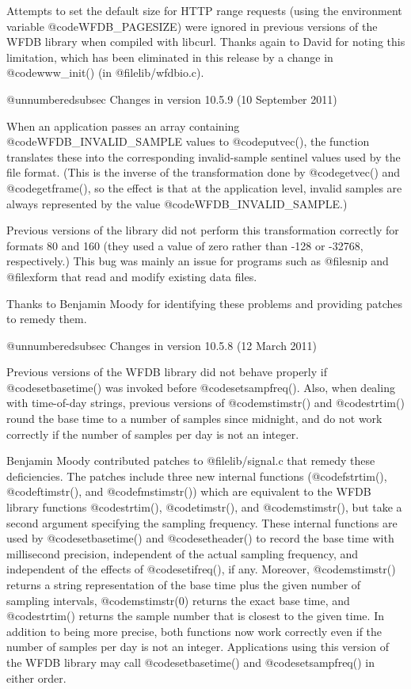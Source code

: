 {{{{{{{{Attempts to set the default size for HTTP range requests (using the environment
variable @code{WFDB_PAGESIZE}) were ignored in previous versions of the WFDB
library when compiled with libcurl.  Thanks again to David for noting this
limitation, which has been eliminated in this release by a change in
@code{www_init()} (in @file{lib/wfdbio.c}).

@unnumberedsubsec Changes in version 10.5.9 (10 September 2011)

When an application passes an array containing @code{WFDB_INVALID_SAMPLE}
values to @code{putvec()}, the function translates these into the corresponding
invalid-sample sentinel values used by the file format.  (This is the inverse
of the transformation done by @code{getvec()} and @code{getframe()}, so the
effect is that at the application level, invalid samples are always represented
by the value @code{WFDB_INVALID_SAMPLE}.)

Previous versions of the library did not perform this transformation correctly
for formats 80 and 160 (they used a value of zero rather than -128 or -32768,
respectively.)  This bug was mainly an issue for programs such as @file{snip}
and @file{xform} that read and modify existing data files.

Thanks to Benjamin Moody for identifying these problems and providing patches
to remedy them.

@unnumberedsubsec Changes in version 10.5.8 (12 March 2011)

Previous versions of the WFDB library did not behave properly if
@code{setbasetime()} was invoked before @code{setsampfreq()}.  Also, when
dealing with time-of-day strings, previous versions of @code{mstimstr()} and
@code{strtim()} round the base time to a number of samples since midnight, and
do not work correctly if the number of samples per day is not an integer.

Benjamin Moody contributed patches to @file{lib/signal.c} that remedy these
deficiencies.  The patches include three new internal functions
(@code{fstrtim()}, @code{ftimstr()}, and @code{fmstimstr()}) which are
equivalent to the WFDB library functions @code{strtim()}, @code{timstr()}, and
@code{mstimstr()}, but take a second argument specifying the sampling
frequency.  These internal functions are used by @code{setbasetime()} and
@code{setheader()} to record the base time with millisecond precision,
independent of the actual sampling frequency, and independent of the effects of
@code{setifreq()}, if any.  Moreover, @code{mstimstr()} returns a string
representation of the base time plus the given number of sampling intervals,
@code{mstimstr(0)} returns the exact base time, and @code{strtim()} returns the
sample number that is closest to the given time.  In addition to being more
precise, both functions now work correctly even if the number of samples per
day is not an integer.  Applications using this version of the WFDB library may
call @code{setbasetime()} and @code{setsampfreq()} in either order.

}}}}}}}}
